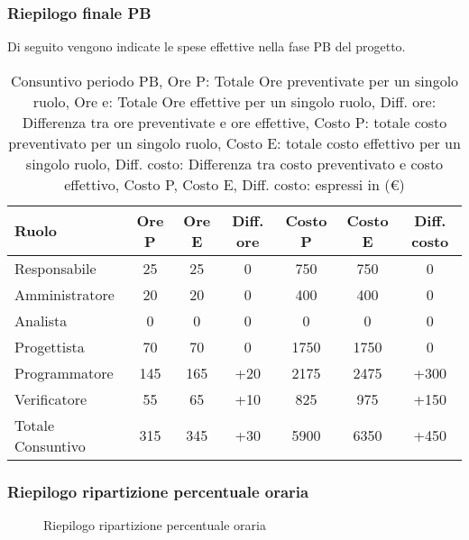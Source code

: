 \subsubsection{Riepilogo finale PB}
Di seguito vengono indicate le spese effettive nella fase PB del progetto.
\begin{table}[H]
	\centering
	\begin{tabular}{l|c|c|c|c|c|c}
		\textbf{Ruolo}    & \textbf{Ore P} & \textbf{Ore E} & \textbf{Diff. ore} & \textbf{Costo P} & \textbf{Costo E} & \textbf{Diff. costo} \\
		\hline
		Responsabile      & 25             & 25             & 0                  & 750              & 750              & 0                    \\
		Amministratore    & 20             & 20             & 0                  & 400              & 400              & 0                    \\
		Analista          & 0              & 0              & 0                  & 0                & 0                & 0                    \\
		Progettista       & 70             & 70             & 0                  & 1750             & 1750             & 0                    \\
		Programmatore     & 145            & 165            & +20                & 2175             & 2475             & +300                 \\
		Verificatore      & 55             & 65             & +10                & 825              & 975              & +150                 \\
		\hline
		Totale Consuntivo & 315            & 345            & +30                & 5900             & 6350             & +450                 \\
		\hline
	\end{tabular}
	\caption{Consuntivo periodo PB, Ore P: Totale Ore preventivate per un singolo ruolo, Ore e: Totale Ore effettive per un singolo ruolo,
		Diff. ore: Differenza tra ore preventivate e ore effettive, Costo P: totale costo preventivato per un singolo ruolo,
		Costo E: totale costo effettivo per un singolo ruolo,  Diff. costo: Differenza tra costo preventivato e costo effettivo,
		Costo P, Costo E, Diff. costo: espressi in (\euro)}
\end{table}


\subsubsection{Riepilogo ripartizione percentuale oraria}
\begin{figure}[h]
	\centering
	\caption{Riepilogo ripartizione percentuale oraria}
\end{figure}

